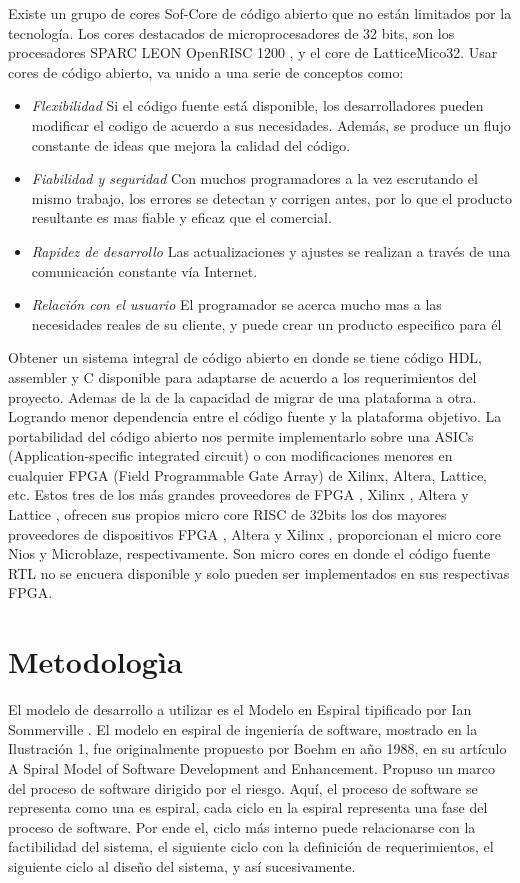 Existe un grupo de cores Sof-Core de código abierto que no están limitados por la tecnología. Los cores destacados de microprocesadores de 32 bits, son los procesadores SPARC LEON OpenRISC 1200 , y el core de LatticeMico32. Usar cores de  código abierto,  va unido a una serie de conceptos como:
 \begin {itemize}
\item
\textit{Flexibilidad}  Si el código fuente está disponible, los desarrolladores pueden modificar el codigo de acuerdo a sus necesidades. Además, se produce un flujo constante de ideas que mejora la calidad del código.
\item 
\textit{Fiabilidad y seguridad}  Con muchos programadores a la vez escrutando el mismo trabajo, los errores se detectan y corrigen antes, por lo que el producto resultante es mas fiable y eficaz que el comercial.
\item 
\textit{Rapidez de desarrollo}  Las actualizaciones y ajustes se realizan a través de una comunicación constante vía Internet.
\item 
\textit{Relación con el usuario} El programador se acerca mucho mas a las necesidades reales de su cliente, y puede crear un producto especifico para él
 \end {itemize}
 
Obtener un sistema integral de código abierto en donde se tiene código HDL, assembler y C disponible para adaptarse de acuerdo a los requerimientos del proyecto. Ademas de la de la capacidad de migrar de una plataforma a otra. Logrando menor dependencia entre el código fuente y la plataforma objetivo. 
La portabilidad del código abierto nos permite implementarlo sobre una ASICs (Application-specific integrated circuit) o con modificaciones menores en cualquier FPGA (Field Programmable Gate Array) de Xilinx, Altera, Lattice, etc. 
Estos tres de los más grandes proveedores de FPGA , Xilinx , Altera y Lattice , ofrecen sus propios micro core RISC de 32bits los dos mayores proveedores de dispositivos FPGA , Altera y Xilinx , proporcionan el micro core Nios y Microblaze, respectivamente. Son micro cores  en donde el código fuente RTL no se encuera disponible y solo pueden ser implementados en sus respectivas FPGA.

\section{Metodologìa}

El modelo de desarrollo a utilizar es el Modelo en Espiral tipificado por Ian Sommerville\cite{Etiqueta00} . El modelo en espiral de ingeniería de software, mostrado en la Ilustración 1, fue originalmente propuesto por Boehm en año 1988, en su artículo A Spiral Model of Software Development and Enhancement. Propuso un marco del proceso de software dirigido por el riesgo. Aquí, el proceso de software se representa como una es espiral, cada ciclo en la espiral representa una fase del proceso de software. Por ende el, ciclo más interno puede relacionarse con la factibilidad del sistema, el siguiente ciclo con la definición de requerimientos, el siguiente ciclo al diseño del sistema, y así sucesivamente.


